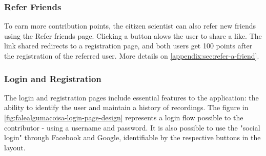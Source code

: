 \subsubsection{Refer Friends}

To earn more contribution points, the citizen scientist can also refer new friends using the Refer friends page. Clicking a button alows the user to share a like. The link shared redirects to a registration page, and both users get 100 points after the registration of the referred user. More details on \ref{appendix:sec:refer-a-friend}.

\subsubsection{Login and Registration}

The login and registration pages include essential features to the application: the ability to identify the user and maintain a history of recordings. The figure in \ref{fig:falealgumacoisa-login-page-design} represents a login flow possible to the contributor - using a username and password. It is also possible to use the "social login" through Facebook and Google, identifiable by the respective buttons in the layout.


